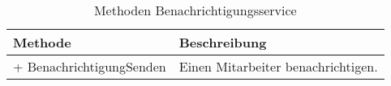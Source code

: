 \begin{table}[ht!]
\centering
\caption{Methoden Benachrichtigungsservice}
\label{tab:MethodenBenachrichtigungsservice}
\begin{tabularx}{\linewidth}{@{}lX@{}}
\toprule
Methode                  & Beschreibung              \\ \midrule
+ BenachrichtigungSenden & Einen Mitarbeiter benachrichtigen.  \\
\end{tabularx}
\end{table}
